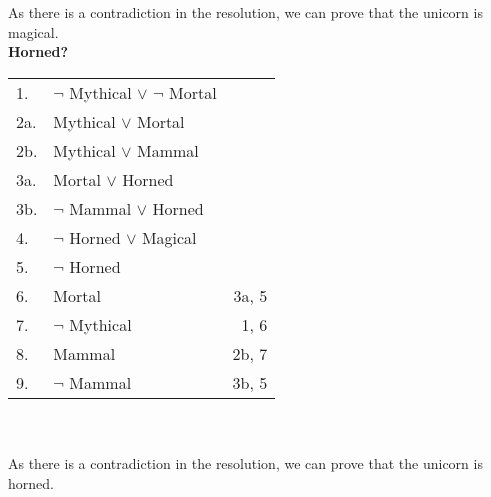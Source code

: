 \documentclass[12pt]{article}
\begin{document}
\begin{enumerate}
\begin{enumerate}
		As there is a contradiction in the resolution, we can prove that the unicorn is magical. \\

		\textbf{Horned?}\\

		\begin{tabular}{l l r}
			1. & $\neg$ Mythical $\lor$ $\neg$ Mortal & \\
			2a. & Mythical $\lor$ Mortal & \\
			2b. & Mythical $\lor$ Mammal & \\
			3a. & Mortal $\lor$ Horned & \\
			3b. & $\neg$ Mammal $\lor$ Horned & \\
			4. & $\neg$ Horned $\lor$ Magical & \\
			5. & $\neg$ Horned & \\
			\hline
			6. & Mortal & 3a, 5 \\
			7. & $\neg$ Mythical & 1, 6 \\
			8. & Mammal & 2b, 7 \\
			9. & $\neg$ Mammal & 3b, 5 \\
		\end{tabular}\\\\

		As there is a contradiction in the resolution, we can prove that the unicorn is horned.
	\end{enumerate}

\end{enumerate}

 
\end{document}
